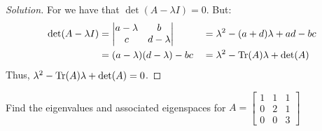 \documentclass[../main.tex]{subfiles}
\begin{document}
\begin{proof}[Solution]
For we have that $\det(A-\lambda I) = 0$. But:
\begin{align*}
    \det(A-\lambda I) &= \begin{vmatrix} a-\lambda & b \\ c & d-\lambda \end{vmatrix} & &= \lambda^2 - (a+d)\lambda + ad - bc\\
    &= (a-\lambda)(d-\lambda) - bc & &= \lambda^{2} - \Tr(A)\lambda + \det(A)
\end{align*}
Thus, $\lambda^2 - \Tr(A) \lambda + \det(A) = 0$.
\end{proof}
%
\begin{problem}
Find the eigenvalues and associated eigenspaces for $A = \begin{bmatrix} 1 & 1 & 1 \\ 0 & 2 & 1 \\ 0 & 0 & 3\end{bmatrix}$
\end{problem}
\end{document}
